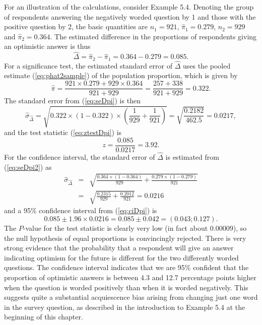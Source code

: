 \documentclass[11pt,a4paper,openany]{book}
\begin{document}
For an illustration of the calculations, consider Example 5.4. Denoting
the group of respondents answering the negatively worded question by 1
and those with the positive question by 2, the basic quantities are
\(n_{1}=921\), \(\hat{\pi}_{1}=0.279\), \(n_{2}=929\) and
\(\hat{\pi}_{2}=0.364\). The estimated difference in the proportions of
respondents giving an optimistic answer is thus
\[\hat{\Delta} = \hat{\pi}_{2}-\hat{\pi}_{1} = 0.364-0.279 = 0.085.\]
For a significance test, the estimated standard error of
\(\hat{\Delta}\) uses the pooled estimate (\ref{eq:phat2sample}) of the
population proportion, which is given by
\[\hat{\pi} = \frac{921\times 0.279+929\times 0.364}{921+929}=
\frac{257+338}{921+929} = 0.322.\] The standard error from
(\ref{eq:seDpi}) is then \[\hat{\sigma}_{\hat{\Delta}}
=
\sqrt{
0.322\times(1-0.322) \times \left(
\frac{1}{929}+
\frac{1}{921}
\right)
}
=
\sqrt{
\frac{0.2182}{462.5}
}=0.0217,\] and the test statistic (\ref{eq:ztestDpi}) is
\[z=\frac{0.085}{0.0217}=3.92.\] For the confidence interval, the
standard error of \(\hat{\Delta}\) is estimated from (\ref{eq:seDpi2})
as \[\begin{aligned}
\hat{\sigma}_{\hat{\Delta}} &=&
\sqrt{
\frac{0.364\times (1-0.364)}{929} +
\frac{0.279\times (1-0.279)}{921}
} \\
&=&
\sqrt{
\frac{0.2315}{929}
+\frac{0.2012}{921}
}=0.0216\end{aligned}\] and a 95\% confidence interval from
(\ref{eq:ciDpi}) is
\[0.085 \pm 1.96 \times 0.0216 = 0.085\pm 0.042 = (0.043; 0.127).\] The
\(P\)-value for the test statistic is clearly very low (in fact about
\(0.00009\)), so the null hypothesis of equal proportions is
convincingly rejected. There is very strong evidence that the
probability that a respondent will give an answer indicating optimism
for the future is different for the two differently worded questions.
The confidence interval indicates that we are 95\% confident that the
proportion of optimistic answers is between 4.3 and 12.7 percentage
points higher when the question is worded positively than when it is
worded negatively. This suggests quite a substantial acquiescence bias
arising from changing just one word in the survey question, as described
in the introduction to Example 5.4 at the beginning of this chapter.
\end{document}
